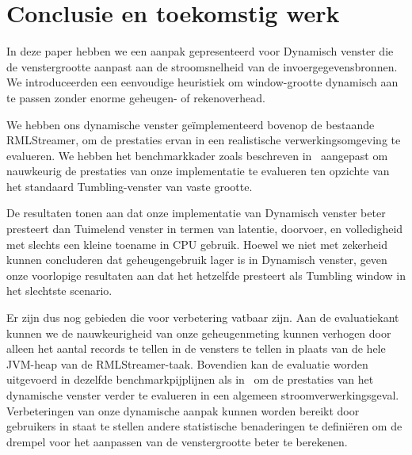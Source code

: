 \section{Conclusie en toekomstig werk}%
\label{chap:Conclusion and Future Works}

In deze paper hebben we een aanpak gepresenteerd voor Dynamisch venster 
die de venstergrootte aanpast aan de stroomsnelheid van de 
invoergegevensbronnen. We introduceerden een eenvoudige heuristiek om 
window-grootte dynamisch aan te passen zonder enorme geheugen- of rekenoverhead. 

We hebben ons dynamische venster geïmplementeerd bovenop de bestaande RMLStreamer, 
om de prestaties ervan in een realistische verwerkingsomgeving te evalueren. 
We hebben het benchmarkkader zoals beschreven in~\cite{evalution_of_spe} aangepast om 
nauwkeurig de prestaties van onze implementatie te evalueren ten opzichte van het 
standaard Tumbling-venster van vaste grootte. 

De resultaten tonen aan dat onze implementatie 
van Dynamisch venster beter presteert dan Tuimelend venster in termen van 
latentie, doorvoer, en volledigheid met slechts een kleine 
toename in CPU gebruik. Hoewel we niet met zekerheid kunnen concluderen dat
geheugengebruik lager is in Dynamisch venster, geven onze voorlopige resultaten aan 
dat het hetzelfde presteert als Tumbling window in het slechtste scenario.

Er zijn dus nog gebieden die voor verbetering vatbaar zijn.
Aan de evaluatiekant kunnen we de 
nauwkeurigheid van onze geheugenmeting kunnen verhogen door alleen het aantal records te tellen
in de vensters te tellen in plaats van de hele JVM-heap van de RMLStreamer-taak. 
Bovendien kan de evaluatie worden uitgevoerd in dezelfde benchmarkpijplijnen als in~\cite{evalution_of_spe} 
om de prestaties van het dynamische venster verder te evalueren in een algemeen stroomverwerkingsgeval.
Verbeteringen van onze dynamische aanpak kunnen worden bereikt door gebruikers in staat te stellen 
andere statistische benaderingen te definiëren
om de drempel voor het aanpassen van de venstergrootte beter te berekenen. 


